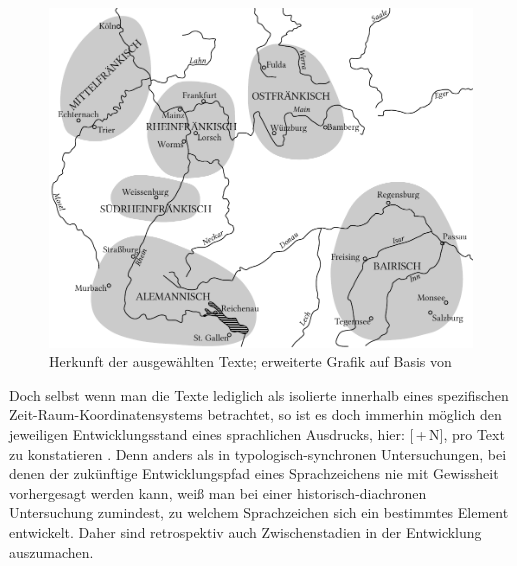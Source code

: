 \begin{figure}
\includegraphics[width=\textwidth]{images/koenig-atlas.pdf}
\caption {Herkunft der ausgewählten Texte; erweiterte Grafik auf Basis von  \textcite{Konig2015}\label{abb:schreiborte}}
\end{figure}

Doch selbst wenn man die Texte lediglich als isolierte  innerhalb eines spezifischen Zeit-Raum-Koordinatensystems \parencite[157]{Leiss2000} betrachtet, so ist es doch immerhin möglich den jeweiligen Entwicklungsstand eines sprachlichen Ausdrucks, hier: [\,+\,N], pro Text
zu konstatieren \parencite[vgl. zu diesem Vorgehen auch][29]{Himmelmann1997}. Denn anders als in typologisch-synchronen Untersuchungen, bei denen der zukünftige Entwicklungspfad eines Sprachzeichens nie mit Gewissheit vorhergesagt werden kann, weiß man bei einer historisch-diachronen Untersuchung zumindest, zu welchem  Sprachzeichen sich ein bestimmtes Element entwickelt. Daher sind retrospektiv auch Zwischenstadien in der Entwicklung auszumachen.      



